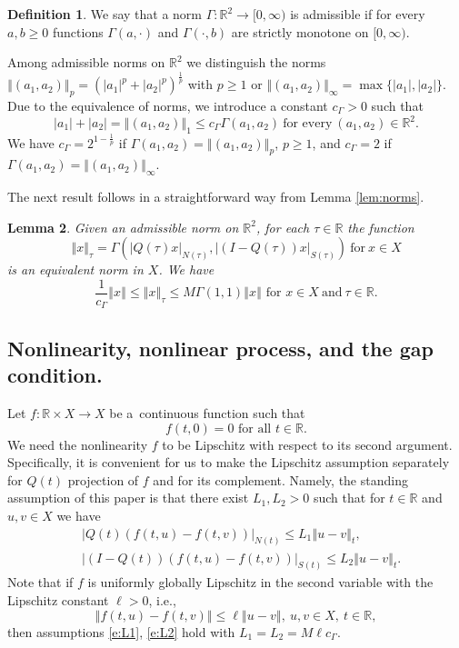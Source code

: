 \documentclass[a4paper,11pt,reqno]{amsart}
\theoremstyle{plain}
\newtheorem{lem}{Lemma}[section]
\theoremstyle{definition}
\newtheorem{defn}[lem]{Definition}
\numberwithin{equation}{section}
\newcommand{\R}{\mathbb{R}}
\newcommand{\norm}[1]{\left\Vert#1\right\Vert}
\renewcommand{\geq}{\geqslant}
\renewcommand{\leq}{\leqslant}
\begin{document}
\begin{defn}\label{defn:ADMISSIBLENORM}
We say that a norm $\Gamma\colon\R^{2}\to[0,\infty)$ is admissible if for every $a,b\geq 0$ functions $\Gamma(a,\cdot)$ and $\Gamma(\cdot,b)$ are strictly monotone on $[0,\infty)$. 
\end{defn}

Among admissible norms on $\R^2$ we distinguish the norms  $\norm{(a_1,a_2)}_{p}=(|a_1|^p+|a_2|^p)^\frac{1}{p}$ with $p\geq 1$ or $\norm{(a_1,a_2)}_{\infty}=\max\{|a_1|,|a_2|\}$. Due to the equivalence of norms, we introduce a constant $c_\Gamma>0$ such that
\begin{equation*}%
|a_1|+|a_2|=\norm{(a_1,a_2)}_{1}\leq c_\Gamma \Gamma(a_1,a_2)\ \text{for every}\ (a_1,a_2)\in\R^{2}.
\end{equation*}
We have $c_\Gamma=2^{1-\frac{1}{p}}$ if $\Gamma(a_1,a_2)=\norm{(a_1,a_2)}_{p}$, $p\geq 1$, and $c_\Gamma=2$ if $\Gamma(a_1,a_2)=\norm{(a_1,a_2)}_{\infty}$.

The next result follows in a straightforward way from Lemma \ref{lem:norms}.
\begin{lem}\label{lem:EQUIVNORMS}
Given an admissible norm on $\R^2$, for each $\tau\in\R$ the function
\begin{equation}\label{e:MOVINGNORM}
\norm{x}_\tau=\Gamma\left(|Q(\tau)x|_{N(\tau)},|(I-Q(\tau))x|_{S(\tau)}\right)\ \text{for}\ x\in X
\end{equation}
is an equivalent norm in $X$. We have 
$$\frac{1}{c_{\Gamma}}\norm{x}\leq\norm{x}_{\tau}\leq M\Gamma(1,1)\norm{x}\text{  for }x\in X\ \text{and}\ \tau\in\R.$$
\end{lem}

\subsection{Nonlinearity, nonlinear process, and the gap condition.} Let $f\colon\R\times X\to X$ be a~continuous function such that 
\begin{equation}\label{e:ZEROCONDITION}
f(t,0)=0\text{ for all }t\in\R.
\end{equation}
We need the nonlinearity $f$ to be Lipschitz with respect to its second argument. Specifically, it is convenient for us to make the Lipschitz assumption separately for $Q(t)$ projection of $f$ and for its complement. Namely, the standing assumption of this paper is that there exist $L_1,L_2>0$ such that for $t\in\R$ and $u,v\in X$ we have
\begin{align}\label{e:L1}
&|Q(t)(f(t,u)-f(t,v))|_{N(t)}\leq L_1\norm{u-v}_{t},\\
&\label{e:L2}
|(I-Q(t))(f(t,u)-f(t,v))|_{S(t)}\leq L_2\norm{u-v}_{t}.
\end{align}
Note that if  $f$ is uniformly globally Lipschitz in the second variable with the Lipschitz constant $\ell>0$, i.e.,
\begin{equation}\label{e:GLOBALLIP}
\norm{f(t,u)-f(t,v)}\leq\ell\norm{u-v},\ u,v\in X,\ t\in\R,
\end{equation} 
then assumptions \eqref{e:L1}, \eqref{e:L2} hold with $L_1=L_2=M\ell c_{\Gamma}$.
\end{document}
